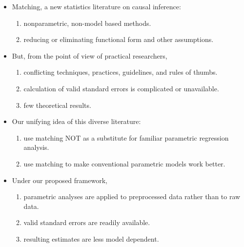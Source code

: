 \documentclass[20pt,landscape,pdftex]{foils}
\begin{document}


\hypersetup{pdfpagetransition=Replace}

\begin{itemize}
\item Matching, a new statistics literature on causal inference:\pause
  \begin{enumerate}
  \item nonparametric, non-model based methods.\pause
  \item reducing or eliminating functional form and other assumptions.\pause
  \end{enumerate}
  
\item But, from the point of view of practical researchers,\pause
  \begin{enumerate}    
  \item conflicting techniques, practices, guidelines, and rules of
    thumbs.\pause 
  \item calculation of valid standard errors is complicated or
    unavailable.\pause
  \item few theoretical results.\pause
  \end{enumerate}

\item Our unifying idea of this diverse literature:\pause 
  \begin{enumerate}
  \item use matching NOT as a substitute for familiar parametric
    regression analysis.\pause
  \item use matching to make conventional parametric models work
    better.\pause 
  \end{enumerate}

\item Under our proposed framework,\pause
  \begin{enumerate}
  \item parametric analyses are applied to preprocessed data rather
    than to raw data.\pause
  \item valid standard errors are readily available.\pause
  \item resulting estimates are less model dependent.\pause
  \end{enumerate} 

\end{itemize}
\end{document}
